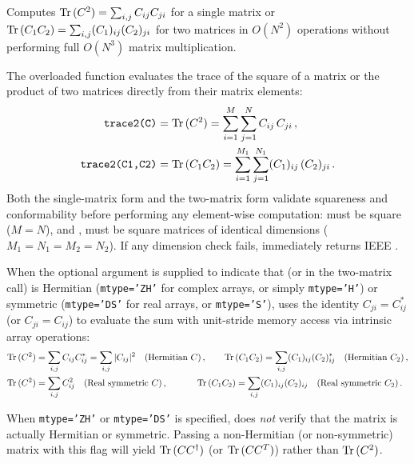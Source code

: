 Computes ${\rm Tr\,}(C^2) = \sum_{i,j} C_{ij} C_{ji}$ for a single matrix or ${\rm Tr\,}(C_1 C_2) = \sum_{i,j} (C_1)_{ij} (C_2)_{ji}$ for two matrices in $O(N^2)$ operations without performing full $O(N^3)$ matrix multiplication.

The overloaded function  evaluates the trace of the square of a matrix or the product of two matrices directly from their matrix elements:
\begin{align}
  \texttt{trace2(C)}     &= {\rm Tr\,}(C^2)    = \sum_{i=1}^{M}\sum_{j=1}^{N} C_{ij}\, C_{ji}\, , \\
  \texttt{trace2(C1,C2)} &= {\rm Tr\,}(C_1 C_2) = \sum_{i=1}^{M_1}\sum_{j=1}^{N_1} (C_1)_{ij}\, (C_2)_{ji}\, .
\end{align}
Both the single-matrix form and the two-matrix form validate squareness and conformability before performing any element-wise computation:  must be square ($M = N$), and ,  must be square matrices of identical dimensions ($M_1 = N_1 = M_2 = N_2$). If any dimension check fails,  immediately returns IEEE .

When the optional argument  is supplied to indicate that  (or  in the two-matrix call) is Hermitian (\texttt{mtype='ZH'} for complex arrays, or simply \texttt{mtype='H'}) or symmetric (\texttt{mtype='DS'} for real arrays, or \texttt{mtype='S'}),  uses the identity $C_{ji} = C_{ij}^*$ (or $C_{ji} = C_{ij}$) to evaluate the sum with unit-stride memory access via intrinsic array operations:
\begin{align}
  {\rm Tr\,}(C^2) &= \sum_{i,j} C_{ij} C_{ij}^* = \sum_{i,j} |C_{ij}|^2 \quad (\text{Hermitian } C)\, , \qquad
  {\rm Tr\,}(C_1 C_2) = \sum_{i,j} (C_1)_{ij} (C_2)_{ij}^* \quad (\text{Hermitian } C_2)\, , \\
  {\rm Tr\,}(C^2) &= \sum_{i,j} C_{ij}^2 \quad (\text{Real symmetric } C)\, , \qquad\quad\,\,
  {\rm Tr\,}(C_1 C_2) = \sum_{i,j} (C_1)_{ij} (C_2)_{ij} \quad (\text{Real symmetric } C_2)\, .
\end{align}

\begin{warnbox}
When \texttt{mtype='ZH'} or \texttt{mtype='DS'} is specified,  does \emph{not} verify that the matrix is actually Hermitian or symmetric. Passing a non-Hermitian (or non-symmetric) matrix with this flag will yield ${\rm Tr\,}(C C^\dagger)$ (or ${\rm Tr\,}(C C^T)$) rather than ${\rm Tr\,}(C^2)$.
\end{warnbox}

